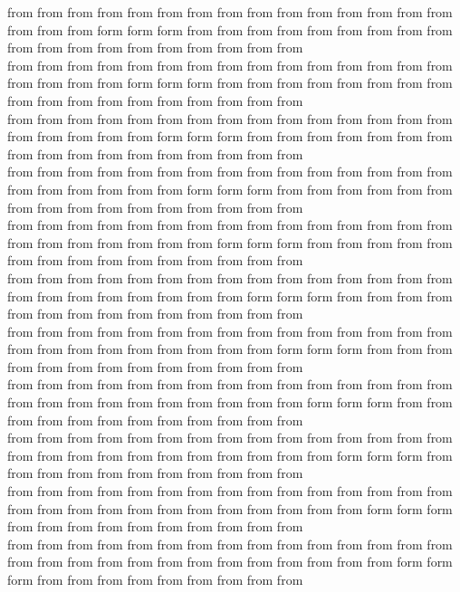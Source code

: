 from from from from from from from from from from from from from from from from from from form form form from from from from from from from from from from from from from from from from from from from\\
from from from from from from from from from from from from from from from from from from from form form form from from from from from from from from from from from from from from from from from from\\
from from from from from from from from from from from from from from from from from from from from form form form from from from from from from from from from from from from from from from from from\\
from from from from from from from from from from from from from from from from from from from from from form form form from from from from from from from from from from from from from from from from\\
from from from from from from from from from from from from from from from from from from from from from from form form form from from from from from from from from from from from from from from from\\
from from from from from from from from from from from from from from from from from from from from from from from form form form from from from from from from from from from from from from from from\\
from from from from from from from from from from from from from from from from from from from from from from from from form form form from from from from from from from from from from from from from\\
from from from from from from from from from from from from from from from from from from from from from from from from from form form form from from from from from from from from from from from from\\
from from from from from from from from from from from from from from from from from from from from from from from from from from form form form from from from from from from from from from from from\\
from from from from from from from from from from from from from from from from from from from from from from from from from from from form form form from from from from from from from from from from\\
from from from from from from from from from from from from from from from from from from from from from from from from from from from from form form form from from from from from from from from from\\
